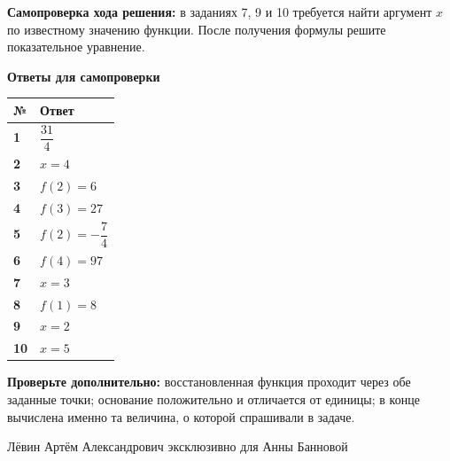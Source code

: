 \documentclass[a4paper,12pt]{article}
\newcommand{\important}[1]{\textbf{\color{darkaccent}#1}}
\begin{document}
\par
\vfill
\important{Самопроверка хода решения:} в заданиях 7, 9 и 10 требуется найти аргумент $x$ по известному значению функции. После получения формулы решите показательное уравнение.
\clearpage
\begin{center}
{\LARGE\bfseries\color{darkaccent}Ответы для самопроверки}
\end{center}
\vspace{6mm}
\renewcommand{\arraystretch}{1.65}
\begin{center}
\begin{tabularx}{\linewidth}{@{}>{\bfseries}p{16mm}X@{}}
\toprule
№ & Ответ\\
\midrule
1 & $\dfrac{31}{4}$\\
2 & $x=4$\\
3 & $f(2)=6$\\
4 & $f(3)=27$\\
5 & $f(2)=-\dfrac74$\\
6 & $f(4)=97$\\
7 & $x=3$\\
8 & $f(1)=8$\\
9 & $x=2$\\
10 & $x=5$\\
\bottomrule
\end{tabularx}
\end{center}
\vspace{8mm}
\important{Проверьте дополнительно:} восстановленная функция проходит через обе заданные точки; основание положительно и отличается от единицы; в конце вычислена именно та величина, о которой спрашивали в задаче.
\vfill
\begin{center}
\small\color{darkaccent}Лёвин Артём Александрович эксклюзивно для Анны Банновой
\end{center}
\end{document}

